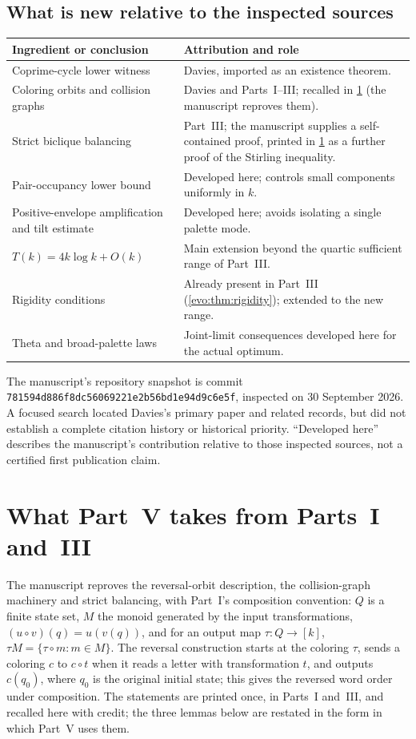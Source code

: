 \documentclass[11pt,a4paper]{article}
\numberwithin{equation}{section}
\theoremstyle{definition}
\theoremstyle{remark}
\begin{document}
\subsection{What is new relative to the inspected sources}\label{nl:sec:ledger}
\begin{center}\small
\begin{tabular}{@{}p{}p{}@{}}
\toprule
Ingredient or conclusion & Attribution and role\\\midrule
Coprime-cycle lower witness & Davies, imported as an existence theorem.\\
Coloring orbits and collision graphs & Davies and Parts~I--III; recalled in \cref{nl:sec:graphs} (the manuscript reproves them).\\
Strict biclique balancing & Part~III; the manuscript supplies a self-contained proof, printed in \cref{nl:sec:graphs} as a further proof of the Stirling inequality.\\
Pair-occupancy lower bound & Developed here; controls small components uniformly in $k$.\\
Positive-envelope amplification and tilt estimate & Developed here; avoids isolating a single palette mode.\\
$T(k)=4k\log k+O(k)$ & Main extension beyond the quartic sufficient range of Part~III.\\
Rigidity conditions & Already present in Part~III (\cref{evo:thm:rigidity}); extended to the new range.\\
Theta and broad-palette laws & Joint-limit consequences developed here for the actual optimum.\\
\bottomrule
\end{tabular}
\end{center}
The manuscript's repository snapshot is commit
\texttt{781594d886f8dc56069221e2b56bd1e94d9c6e5f}, inspected on
30 September 2026. A focused search located Davies's primary paper and
related records, but did not establish a complete citation history or
historical priority. ``Developed here'' describes the manuscript's
contribution relative to those inspected sources, not a certified first
publication claim.

\section{What Part~V takes from Parts~I and~III}\label{nl:sec:graphs}

The manuscript reproves the reversal-orbit description, the collision-graph
machinery and strict balancing, with Part~I's composition convention:
$Q$ is a finite state set, $M$ the monoid generated by the input
transformations, $(u\circ v)(q)=u(v(q))$, and for an output map
$\tau:Q\to[k]$, $\tau M=\{\tau\circ m:m\in M\}$. The reversal construction
starts at the coloring $\tau$, sends a coloring $c$ to $c\circ t$ when it
reads a letter with transformation $t$, and outputs $c(q_0)$, where $q_0$ is
the original initial state; this gives the reversed word order under
composition. The statements are printed once, in Parts~I and~III, and
recalled here with credit; the three lemmas below are restated in the form
in which Part~V uses them.
\end{document}
